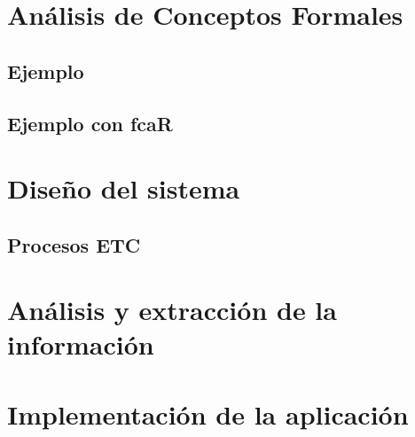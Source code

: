 \documentclass[12pt, a4paper, twoside]{article}
\begin{document}
\section{Análisis de Conceptos Formales}

\newpage\cleardoublepage

\subsection{Ejemplo}

\newpage\cleardoublepage

\subsection{Ejemplo con fcaR}

\newpage\cleardoublepage


\section{Diseño del sistema}
\subsection{Procesos ETC}

\newpage\cleardoublepage

%


\section{Análisis y extracción de la información}

\newpage\cleardoublepage


\section{Implementación de la aplicación}

\newpage\cleardoublepage

\newpage\cleardoublepage
\end{document}
